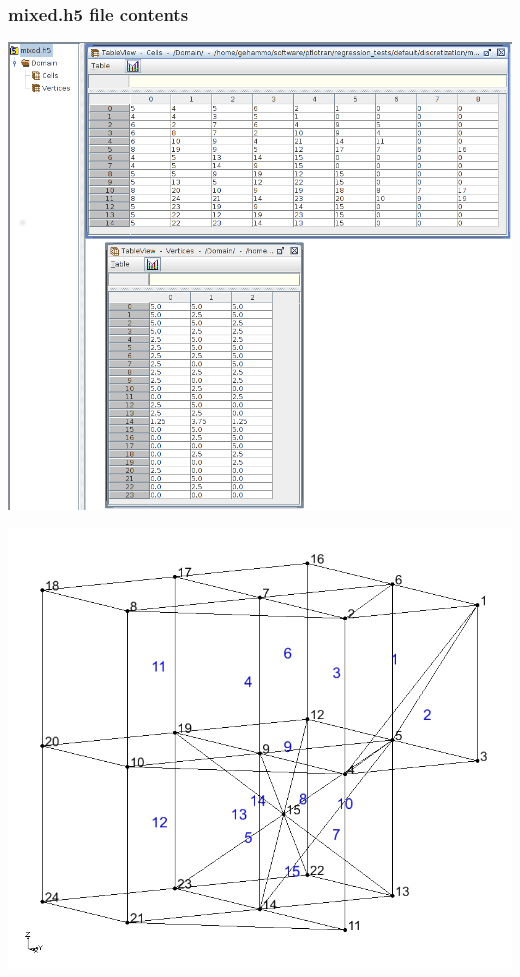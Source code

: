 \documentclass{beamer}
\begin{document}
\begin{frame}\frametitle{mixed.h5 file contents}

\begin{minipage}[t]{0.48\linewidth}
\vspace{-0.1in}
\includegraphics[width=1.8\linewidth]{./mixed_h5.png}
\end{minipage}
\hfill
\begin{minipage}[t]{0.48\linewidth}
  \vspace{1.4in}
  \hspace{.1in}
  \includegraphics[width=1.\linewidth]{./mixed}
\end{minipage}

\end{frame}
\end{document}
